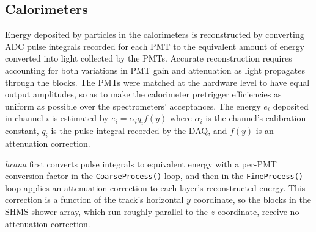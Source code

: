 \subsection{Calorimeters}


%

Energy deposited by particles in the calorimeters is reconstructed by
converting ADC pulse integrals recorded for each PMT to
the equivalent amount of energy converted into light collected by the PMTs.
Accurate reconstruction requires accounting for both
variations in PMT gain
and
attenuation as light propagates through the blocks.
The PMTs were matched at the hardware level to have equal output amplitudes, so
as to make the calorimeter pretrigger efficiencies as uniform as possible over
the spectrometers' acceptances.
The energy $e_i$ deposited in channel $i$ is estimated by
$e_i = \alpha_i q_i f(y)$
where
$\alpha_i$ is the channel's calibration constant,
$q_i$ is the pulse integral recorded by the DAQ,
and $f(y)$ is an attenuation correction.

\textit{hcana} first converts pulse integrals to equivalent energy with a
per-PMT conversion factor in the \texttt{CoarseProcess()} loop, and then
in the \texttt{FineProcess()} loop applies an attenuation correction
to each layer's reconstructed energy.
This correction is a function of the track's horizontal $y$ coordinate, so the
blocks in the SHMS shower array, which run roughly parallel to the $z$
coordinate, receive no attenuation correction.

